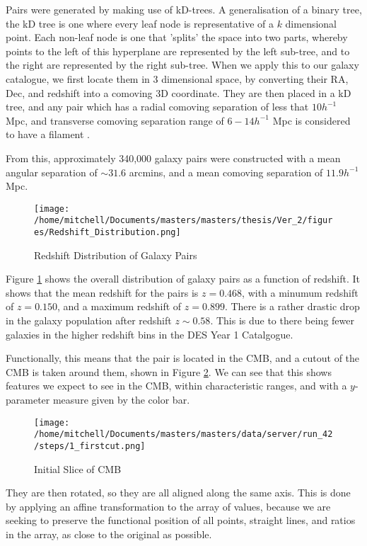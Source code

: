 Pairs were generated by making use of kD-trees. A generalisation of a binary tree, the kD tree is one where every leaf node is representative of a $k$ dimensional point. Each non-leaf node is one that 'splits' the space into two parts, whereby points to the left of this hyperplane are represented by the left sub-tree, and to the right are represented by the right sub-tree. When we apply this to our galaxy catalogue, we first locate them in 3 dimensional space, by converting their RA, Dec, and redshift into a comoving 3D coordinate. They are then placed in a kD tree, and any pair which has a radial comoving separation of less that $10 h^{-1} $ Mpc, and transverse comoving separation range of $6 - 14 h^{-1} $ Mpc is considered to have a filament \citep{2016MNRAS.457.2391C}.

From this, approximately 340,000 galaxy pairs were constructed with a mean angular separation of $\sim 31.6 $ arcmins, and a mean comoving separation of $11.9 h^{-1}$ Mpc. 
\begin{figure}[h!]
\centering
\texttt{[image: /home/mitchell/Documents/masters/masters/thesis/Ver\_2/figures/Redshift\_Distribution.png]}
\caption{Redshift Distribution of Galaxy Pairs}
\label{fig:pairs_dist}
\end{figure}

Figure \ref{fig:pairs_dist} shows the overall distribution of galaxy pairs as a function of redshift. It shows that the mean redshift for the pairs is $z=0.468$, with a minumum redshift of $z= 0.150$, and a maximum redshift of $z= 0.899$. There is a rather drastic drop in the galaxy population after redshift $z \sim 0.58$. This is due to there being fewer galaxies in the higher redshift bins in the DES Year 1 Catalgogue.  


Functionally, this means that the pair is located in the CMB, and a cutout of the CMB is taken around them, shown in Figure \ref{fig:first_cut}. We can see that this shows features we expect to see in the CMB, within characteristic ranges, and with a $y$-parameter measure given by the color bar. 

\begin{figure}[h!]
\centering 
\texttt{[image: /home/mitchell/Documents/masters/masters/data/server/run\_42/steps/1\_firstcut.png]}
\caption{Initial Slice of CMB}
\label{fig:first_cut}
\end{figure}

They are then rotated, so they are all aligned along the same axis. This is done by applying an affine transformation to the array of values, because we are seeking to preserve the functional position of all points, straight lines, and ratios in the array, as close to the original as possible. 

